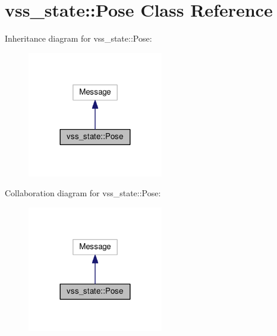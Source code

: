 \hypertarget{classvss__state_1_1Pose}{}\section{vss\+\_\+state\+:\+:Pose Class Reference}
\label{classvss__state_1_1Pose}


Inheritance diagram for vss\+\_\+state\+:\+:Pose\+:
\nopagebreak
\begin{figure}[H]
\begin{center}
\leavevmode
\includegraphics[width=168pt]{classvss__state_1_1Pose__inherit__graph}
\end{center}
\end{figure}


Collaboration diagram for vss\+\_\+state\+:\+:Pose\+:
\nopagebreak
\begin{figure}[H]
\begin{center}
\leavevmode
\includegraphics[width=168pt]{classvss__state_1_1Pose__coll__graph}
\end{center}
\end{figure}
